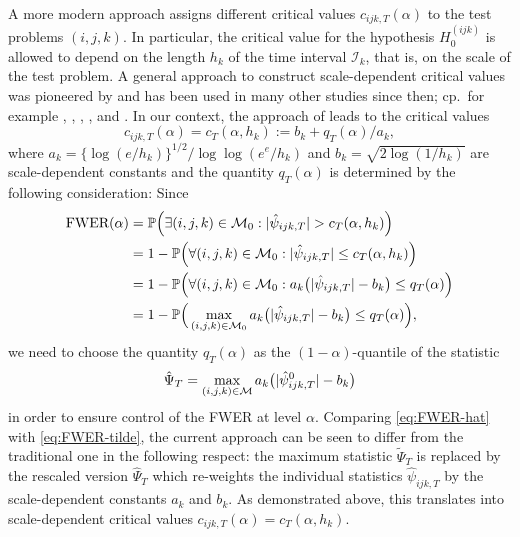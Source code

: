 \documentclass[a4paper,12pt]{article}
\numberwithin{equation}{section}
\begin{document}
A more modern approach assigns different critical values $c_{ijk,T}(\alpha)$ to the test problems $(i,j,k)$. In particular, the critical value for the hypothesis $H_0^{(ijk)}$ is allowed to depend on the length $h_k$ of the time interval $\mathcal{I}_k$, that is, on the scale of the test problem. A general approach to construct scale-dependent critical values was pioneered by \cite{DuembgenSpokoiny2001} and has been used in many other studies since then; cp.\ for example \cite{Rohde2008}, \cite{DuembgenWalther2008}, \cite{RufibachWalther2010}, \cite{SchmidtHieber2013}, \cite{EckleBissantzDette2017} and \cite{Dunker2019}. In our context, the approach of \cite{DuembgenSpokoiny2001} leads to the critical values 
\begin{equation*}
c_{ijk,T}(\alpha) = c_T(\alpha,h_k) := b_k + q_T(\alpha)/a_k, 
\end{equation*}
where $a_k = \{\log(e/h_k)\}^{1/2} / \log \log(e^e / h_k)$ and $b_k = \sqrt{2 \log(1/h_k)}$ are scale-dependent constants and the quantity $q_T(\alpha)$ is determined by the following consideration: Since 
\begin{align}
\text{FWER}(\alpha)
  & = \mathbb{P} \Big( \exists (i,j,k) \in \mathcal{M}_0: |\hat{\psi}_{ijk,T}| > c_T(\alpha,h_k) \Big) \nonumber \\
 & =  1 - \mathbb{P} \Big( \forall (i,j,k) \in \mathcal{M}_0: |\hat{\psi}_{ijk,T}| \le c_T(\alpha,h_k) \Big) \nonumber \\
 & =  1 - \mathbb{P} \Big( \forall (i,j,k) \in \mathcal{M}_0: a_k \big(|\hat{\psi}_{ijk,T}| - b_k\big) \le q_T(\alpha) \Big) \nonumber \\
 & = 1 - \mathbb{P}\Big( \max_{(i,j,k) \in \mathcal{M}_0} a_k \big( |\hat{\psi}_{ijk,T}| - b_k \big) \le q_T(\alpha) \Big), \label{eq:FWER-hat}
\end{align}
we need to choose the quantity $q_T(\alpha)$ as the $(1-\alpha)$-quantile of the statistic 
\[ \hat{\Psi}_T = \max_{(i,j,k) \in \mathcal{M}} a_k \big( |\hat{\psi}_{ijk,T}^0| - b_k \big) \]
in order to ensure control of the FWER at level $\alpha$. Comparing \eqref{eq:FWER-hat} with \eqref{eq:FWER-tilde}, the current approach can be seen to differ from the traditional one in the following respect: the maximum statistic $\tilde{\Psi}_T$ is replaced by the rescaled version $\hat{\Psi}_T$ which re-weights the individual statistics $\hat{\psi}_{ijk,T}$ by the scale-dependent constants $a_k$ and $b_k$. As demonstrated above, this translates into scale-dependent critical values $c_{ijk,T}(\alpha) = c_T(\alpha,h_k)$. 
\end{document}
